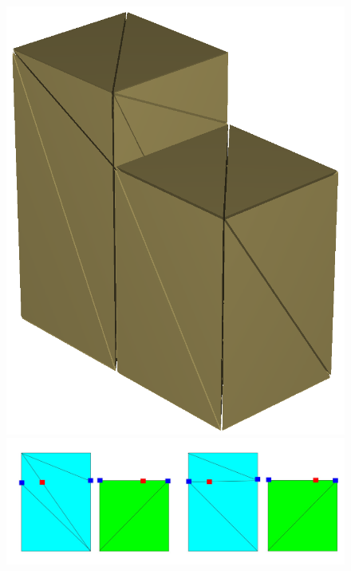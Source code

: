 \begin{figure}[t]
\begin{minipage}{0.9\linewidth}
\begin{minipage}{0.25\textwidth}
\includegraphics[width=\textwidth]{images/TetraMesh_WithNullFaces_AfterSubdivision_crop.png}
\end{minipage}
\begin{minipage}{0.45\textwidth}
\includegraphics[width=\textwidth]{images/Subdivision_Example_3.jpg}
\end{minipage}
\begin{minipage}{0.25\textwidth}

\end{minipage}
\end{minipage}
\end{figure}
